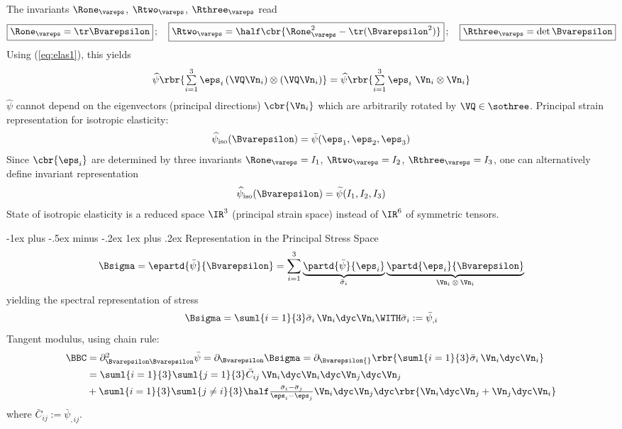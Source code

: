 \documentclass[10pt,landscape]{article}
\makeatletter
\newcommand{\veps}{\vareps}
\def\Bveps{\Bvarepsilon}
\renewcommand{\subsubsection}{\@startsection{subsubsection}{3}{0mm}%
                                {-1ex plus -.5ex minus -.2ex}%
                                {1ex plus .2ex}%
                                {\normalfont\small\bfseries}}
\makeatother
\begin{document}
\begin{multicols*}{3}
The invariants $\Rone_\veps$, $\Rtwo_\veps$, $\Rthree_\veps$ read
\begin{equation}
  \boxed{\Rone_\veps=\tr\Bveps}\,;\quad
  \boxed{\Rtwo_\veps=\half\cbr{\Rone_\veps^2-\tr(\Bveps^2)}}\,;\quad
  \boxed{\Rthree_\veps = \det\Bveps}
\end{equation}
%
Using (\ref{eq:elas1}), this yields
%
\begin{equation}
\textstyle  \widehat{\psi}\rbr{\sum\limits_{i=1}^3 \eps_i\,(\VQ\Vn_i)\otimes(\VQ\Vn_i)}
  = \widehat{\psi}\rbr{\sum\limits_{i=1}^3 \eps_i\,\,\Vn_i\otimes\Vn_i}
\end{equation}
%
$\widehat{\psi}$ cannot depend on the eigenvectors (principal directions)
$\cbr{\Vn_i}$ which are arbitrarily rotated by $\VQ\in\sothree$.
Principal strain representation for isotropic elasticity:
%
\begin{equation}
  \widehat{\psi}_\textup{iso}(\Bveps) = \bar{\psi}(\eps_1,\eps_2,\eps_3)
\end{equation}
Since $\cbr{\eps_i}$ are determined by three invariants $\Rone_\veps=I_1$,
$\Rtwo_\veps=I_2$, $\Rthree_\veps=I_3$, one can
alternatively define invariant representation
%
\begin{equation}
  \widehat{\psi}_\textup{iso}(\Bveps) = \widetilde{\psi}(I_1,I_2,I_3)
\end{equation}
State of isotropic elasticity is a reduced space $\IR^3$ (principal strain
space) instead of $\IR^6$ of symmetric tensors.

\subsubsection{Representation in the Principal Stress Space}
\begin{equation}
  \Bsigma = \epartd{\bar{\psi}}{\Bveps}=
  \sum\limits_{i=1}^{3}
  \underbrace{\partd{\bar{\psi}}{\eps_i}}_\text{$\bar{\sigma}_i$}
  \underbrace{\partd{\eps_i}{\Bveps}}_\text{$\Vn_i\otimes\Vn_i$}
\end{equation}
yielding the spectral representation of stress
\begin{equation}
  \Bsigma=\suml{i=1}{3}\bar{\sigma}_i\,\Vn_i\dyc\Vn_i \WITH
  \bar{\sigma}_i:=\bar{\psi}_{,i} \label{eq:specstress}
\end{equation}
Tangent modulus, using chain rule:
%
\begin{align}
 \nonumber \BBC &= \textstyle  \partial^2_{\Bveps\Bveps}\bar{\psi} = \partial_{\Bveps}\Bsigma
  = \partial_{\Bveps{}} \rbr{\suml{i=1}{3}\bar{\sigma}_i\,\Vn_i\dyc\Vn_i} \\
  \nonumber  & \textstyle = \suml{i=1}{3}\suml{j=1}{3} \bar{C}_{ij}\,\Vn_i\dyc\Vn_i\dyc\Vn_j\dyc\Vn_j \\
             & \textstyle + \suml{i=1}{3}\suml{j\neq i}{3}\half
               \frac{\bar{\sigma}_i-\bar{\sigma}_j}{\eps_i-\eps_j}
               \Vn_i\dyc\Vn_j\dyc\rbr{\Vn_i\dyc\Vn_j+\Vn_j\dyc\Vn_i}
\end{align}
where $\bar{C}_{ij}:=\bar{\psi}_{,ij}$.


\end{multicols*}
\end{document}
